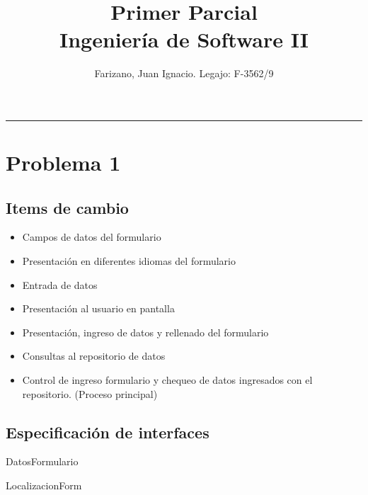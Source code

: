 \documentclass[12pt,a4paper,fleqn]{article}
\title{
    Primer Parcial \\
    \large Ingeniería de Software II}
\author{Farizano, Juan Ignacio. Legajo: F-3562/9}
\date{}
\begin{document}
\maketitle
\rule{\textwidth}{1pt}
\tableofcontents
\newpage


\section{Problema 1}

\subsection{Items de cambio}
\begin{itemize}
  \item Campos de datos del formulario
  \item Presentación en diferentes idiomas del formulario
  \item Entrada de datos
  \item Presentación al usuario en pantalla
  \item Presentación, ingreso de datos y rellenado del formulario
  \item Consultas al repositorio de datos
  \item Control de ingreso formulario y chequeo de datos ingresados con el repositorio. (Proceso principal)
\end{itemize}

\subsection{Especificación de interfaces}

\begin{module}{DatosFormulario}
\eproc
{}
\end{module}

\begin{module}{LocalizacionForm}
\eproc
{}
\end{module}
\end{document}
